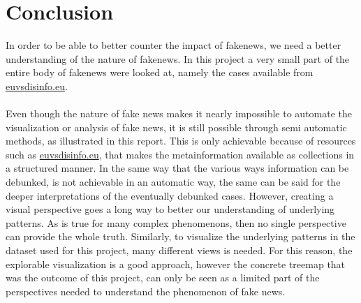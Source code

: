 \documentclass{article}
\begin{document}
\section{Conclusion}
In order to be able to better counter the impact of fakenews, we need a better understanding of the nature of fakenews. In this project a very small part of the entire body of fakenews were looked at, namely the cases available from \href{https://euvsdisinfo.eu}{euvsdisinfo.eu}.
\\\\
Even though the nature of fake news makes it nearly impossible to automate the visualization or analysis of fake news, it is still possible through semi automatic methods, as illustrated in this report. This is only achievable because of resources such as \href{https://euvsdisinfo.eu}{euvsdisinfo.eu}, that makes the metainformation available as collections in a structured manner. In the same way that the various ways information can be debunked, is not achievable in an automatic way, the same can be said for the deeper interpretations of the eventually debunked cases. However, creating a visual perspective goes a long way to better our understanding of underlying patterns. As is true for many complex phenomenons, then no single perspective can provide the whole truth. Similarly, to visualize the underlying patterns in the dataset used for this project, many different views is needed. For this reason, the explorable visualization is a good approach, however the concrete treemap that was the outcome of this project, can only be seen as a limited part of the perspectives needed to understand the phenomenon of fake news.

\newpage


\end{document}
